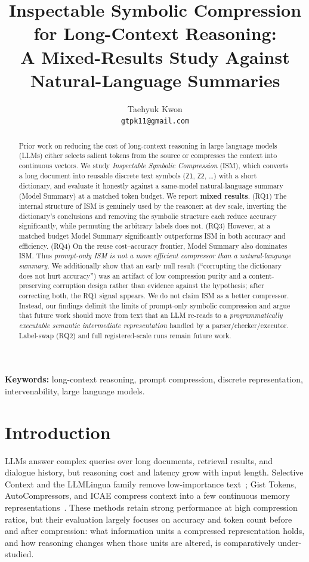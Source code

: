 \documentclass{article}
\title{Inspectable Symbolic Compression for Long-Context Reasoning:\\
A Mixed-Results Study Against Natural-Language Summaries}
\author{%
  Taehyuk Kwon\\
  \texttt{gtpk11@gmail.com}\\
}
\begin{document}
\maketitle

\begin{abstract}
Prior work on reducing the cost of long-context reasoning in large language
models (LLMs) either selects salient tokens from the source or compresses the
context into continuous vectors. We study \emph{Inspectable Symbolic
Compression} (ISM), which converts a long document into reusable discrete text
symbols (\texttt{Z1}, \texttt{Z2}, \dots) with a short dictionary, and evaluate
it honestly against a same-model natural-language summary (Model Summary) at a
matched token budget. We report \textbf{mixed results}. (RQ1) The internal
structure of ISM is genuinely used by the reasoner: at dev scale, inverting the
dictionary's conclusions and removing the symbolic structure each reduce
accuracy significantly, while permuting the arbitrary labels does not. (RQ3)
However, at a matched budget Model Summary significantly outperforms ISM in both
accuracy and efficiency. (RQ4) On the reuse cost--accuracy frontier, Model
Summary also dominates ISM. Thus \emph{prompt-only ISM is not a more efficient
compressor than a natural-language summary}. We additionally show that an early
null result (``corrupting the dictionary does not hurt accuracy'') was an
artifact of low compression purity and a content-preserving corruption design
rather than evidence against the hypothesis; after correcting both, the RQ1
signal appears. We do not claim ISM as a better compressor. Instead, our
findings delimit the limits of prompt-only symbolic compression and argue that
future work should move from text that an LLM re-reads to a
\emph{programmatically executable semantic intermediate representation} handled
by a parser/checker/executor. Label-swap (RQ2) and full registered-scale runs
remain future work.
\end{abstract}

\noindent\textbf{Keywords:} long-context reasoning, prompt compression, discrete
representation, intervenability, large language models.

\section{Introduction}
LLMs answer complex queries over long documents, retrieval results, and dialogue
history, but reasoning cost and latency grow with input length. Selective
Context and the LLMLingua family remove low-importance text~\cite{li2023sc,
jiang2023llmlingua,jiang2024longllmlingua,pan2024llmlingua2}; Gist Tokens,
AutoCompressors, and ICAE compress context into a few continuous memory
representations~\cite{mu2023gist,chevalier2023autocomp,ge2024icae}. These methods
retain strong performance at high compression ratios, but their evaluation
largely focuses on accuracy and token count before and after compression: what
information units a compressed representation holds, and how reasoning changes
when those units are altered, is comparatively under-studied.
\end{document}
